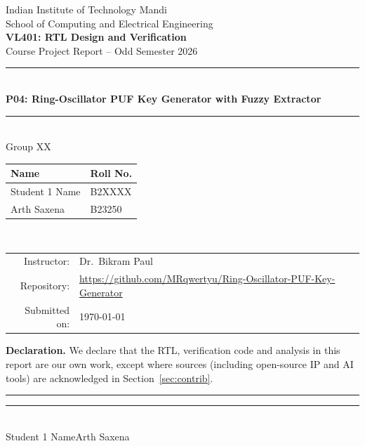 \documentclass[11pt,a4paper]{article}
\newcommand{\groupno}{XX}                         %
\newcommand{\projno}{P04}
\newcommand{\projtitle}{Ring-Oscillator PUF Key Generator with Fuzzy Extractor}
\newcommand{\studentA}{Student 1 Name}            %
\newcommand{\rollA}{B2XXXX}                       %
\newcommand{\studentB}{Arth Saxena}               %
\newcommand{\rollB}{B23250}                       %
\newcommand{\repourl}{https://github.com/MRqwertyu/Ring-Oscillator-PUF-Key-Generator}
\newcommand{\submitdate}{\today}
\begin{document}
\begin{titlepage}
\centering
{\large Indian Institute of Technology Mandi}\\[2pt]
{\normalsize School of Computing and Electrical Engineering}\\[1.6cm]
{\Large\bfseries VL401: RTL Design and Verification}\\[4pt]
{\large Course Project Report -- Odd Semester 2026}\\[1.6cm]
{\color{iitblue}\rule{\linewidth}{1pt}}\\[8pt]
{\LARGE\bfseries \projno: \projtitle}\\[8pt]
{\color{iitblue}\rule{\linewidth}{1pt}}\\[1.4cm]
{\large Group \groupno}\\[10pt]
\begin{tabular}{ll}
\toprule
\textbf{Name} & \textbf{Roll No.}\\
\midrule
\studentA & \rollA\\
\studentB & \rollB\\
\bottomrule
\end{tabular}\\[1.2cm]
\begin{tabular}{rl}
Instructor: & Dr.\ Bikram Paul\\
Repository: & \url{\repourl}\\
Submitted on: & \submitdate\\
\end{tabular}
\vfill
\begin{minipage}{0.92\linewidth}\small
\textbf{Declaration.} We declare that the RTL, verification code and analysis in this report are our own
work, except where sources (including open-source IP and AI tools) are acknowledged in
Section~\ref{sec:contrib}.\\[1.0cm]
\rule{5.5cm}{0.4pt}\hfill\rule{5.5cm}{0.4pt}\\
\studentA\hfill\studentB
\end{minipage}
\end{titlepage}
\end{document}
